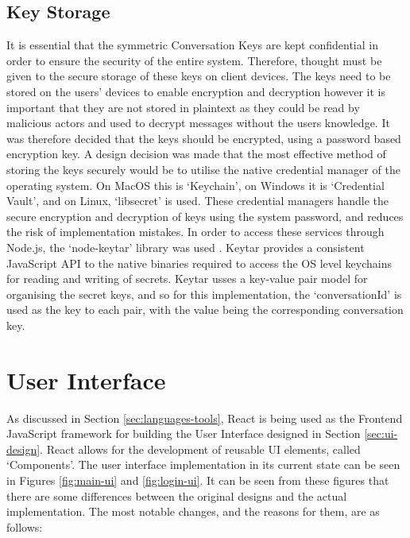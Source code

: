 \subsection{Key Storage}
It is essential that the symmetric Conversation Keys are kept confidential in order to ensure the security of the entire system. Therefore, thought must be given to the secure storage of these keys on client devices. The keys need to be stored on the users' devices to enable encryption and decryption however it is important that they are not stored in plaintext as they could be read by malicious actors and used to decrypt messages without the users knowledge. It was therefore decided that the keys should be encrypted, using a password based encryption key. A design decision was made that the most effective method of storing the keys securely would be to utilise the native credential manager of the operating system. On MacOS this is `Keychain', on Windows it is `Credential Vault', and on Linux, `libsecret' is used. These credential managers handle the secure encryption and decryption of keys using the system password, and reduces the risk of implementation mistakes. In order to access these services through Node.js, the `node-keytar' library was used \cite{keytar}. Keytar provides a consistent JavaScript API to the native binaries required to access the OS level keychains for reading and writing of secrets. Keytar usses a key-value pair model for organising the secret keys, and so for this implementation, the `conversationId' is used as the key to each pair, with the value being the corresponding conversation key.

\section{User Interface}
As discussed in Section \ref{sec:languages-tools}, React is being used as the Frontend JavaScript framework for building the User Interface designed in Section \ref{sec:ui-design}. React allows for the development of reusable UI elements, called `Components'. The user interface implementation in its current state can be seen in Figures \ref{fig:main-ui} and \ref{fig:login-ui}. It can be seen from these figures that there are some differences between the original designs and the actual implementation. The most notable changes, and the reasons for them, are as follows:

